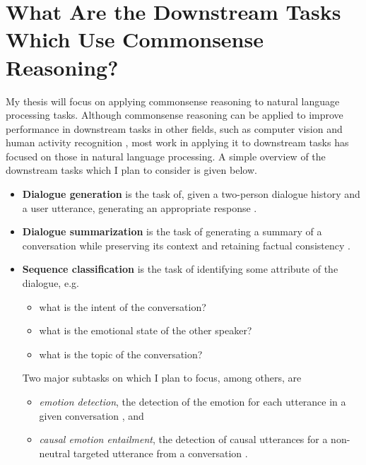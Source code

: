 \documentclass[12pt]{report}
\begin{document}
\section{What Are the Downstream Tasks Which Use Commonsense Reasoning?}

My thesis will focus on applying commonsense reasoning to natural language processing tasks.
Although commonsense reasoning can be applied to improve performance in downstream tasks in other fields, such as computer vision \cite{Zellers2019-to} and human activity recognition \cite{Martinez_del_Rincon2013-qo}, most work in applying it to downstream tasks has focused on those in natural language processing.
A simple overview of the downstream tasks which I plan to consider is given below.

\begin{itemize}[nolistsep]
    \item
        \textbf{Dialogue generation} is the task of, given a two-person dialogue history and a user utterance, generating an appropriate response \cite{Li2016-ef}.
    \item 
        \textbf{Dialogue summarization} is the task of generating a summary of a conversation while preserving its context \cite{Kim2022-pz} and retaining factual consistency \cite{Richardson2023-mq}.
    \item 
        \textbf{Sequence classification} is the task of identifying some attribute of the dialogue, e.g.
        \begin{itemize}[nolistsep]
            \item what is the intent of the conversation?
            \item what is the emotional state of the other speaker?
            \item what is the topic of the conversation?
        \end{itemize}
        Two major subtasks on which I plan to focus, among others, are
        \begin{itemize}[nolistsep]
            \item \textit{emotion detection}, the detection of the emotion for each utterance in a given conversation \cite{Yi2022-tv}, and
            \item \textit{causal emotion entailment}, the detection of causal utterances for a non-neutral targeted utterance from a conversation \cite{Li2022-jr}.
        \end{itemize}
\end{itemize}
\end{document}
